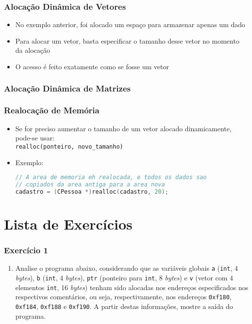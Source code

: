 \documentclass[aspectratio=169]{beamer}
\begin{document}
\begin{frame}[fragile]\frametitle{Alocação Dinâmica de Vetores}
\begin{itemize}
	\item No exemplo anterior, foi alocado um espaço para armazenar apenas um dado
	\item Para alocar um vetor, basta especificar o tamanho desse vetor no momento da alocação
	\item O acesso é feito exatamente como se fosse um vetor

	\end{itemize}
\end{frame}

\begin{frame}[fragile]\frametitle{Alocação Dinâmica de Matrizes}

\end{frame}

\begin{frame}[fragile]\frametitle{Realocação de Memória}
\begin{itemize}
	\item Se for preciso aumentar o tamanho de um vetor alocado dinamicamente, pode-se usar:\\\texttt{realloc(ponteiro, novo\_tamanho)}
	\item Exemplo:
\begin{lstlisting}[language=C++]
// A area de memoria eh realocada, e todos os dados sao
// copiados da area antiga para a area nova
cadastro = (CPessoa *)realloc(cadastro, 20);
\end{lstlisting}
\end{itemize}
\end{frame}

\section{Lista de Exercícios}

\begin{frame}[fragile]\frametitle{Exercício 1}
\begin{enumerate}
	\small	
	\item Analise o programa abaixo, considerando que as variáveis globais \texttt{a} (\texttt{int}, 4 \emph{bytes}), \texttt{b} (\texttt{int}, 4 \emph{bytes}), \texttt{ptr} (ponteiro para \texttt{int}, 8 \emph{bytes}) e \texttt{v} (vetor com 4 elementos \texttt{int}, 16 \emph{bytes}) tenham sido alocadas nos endereços especificados nos respectivos comentários, ou seja, respectivamente, nos endereços \texttt{0xf180}, \texttt{0xf184}, \texttt{0xf188} e \texttt{0xf190}. A partir destas informações, mostre a saída do programa.
\fontsize{5pt}{5pt}\selectfont{

}
	\end{enumerate}
\end{frame}
\end{document}
